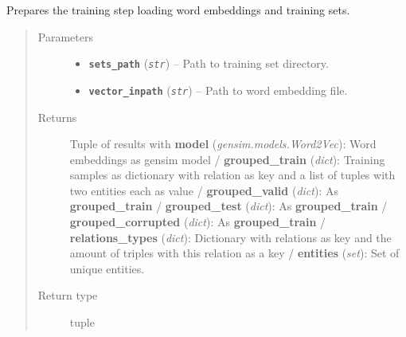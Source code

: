 \documentclass[letterpaper,10pt,english]{sphinxmanual}
\begin{document}

\begin{fulllineitems}
\label{src.trans_e:src.trans_e.trans_we.prepare_training}
Prepares the training step loading word embeddings and training sets.
\begin{quote}\begin{description}
\item[{Parameters}] \leavevmode\begin{itemize}
\item {} 
\textbf{\texttt{sets\_path}} (\emph{\texttt{str}}) -- Path to training set directory.

\item {} 
\textbf{\texttt{vector\_inpath}} (\emph{\texttt{str}}) -- Path to word embedding file.

\end{itemize}

\item[{Returns}] \leavevmode
Tuple of results with \textbf{model} (\emph{gensim.models.Word2Vec}): Word embeddings as gensim model /
\textbf{grouped\_train} (\emph{dict}): Training samples as dictionary with relation as key and a list of tuples
with two entities each as value / \textbf{grouped\_valid} (\emph{dict}): As \textbf{grouped\_train} / \textbf{grouped\_test}
(\emph{dict}): As \textbf{grouped\_train} / \textbf{grouped\_corrupted} (\emph{dict}): As \textbf{grouped\_train} /
\textbf{relations\_types} (\emph{dict}): Dictionary with relations as key and the amount of triples with this relation
as a key / \textbf{entities} (\emph{set}): Set of unique entities.

\item[{Return type}] \leavevmode
tuple

\end{description}\end{quote}

\end{fulllineitems}

\end{document}
